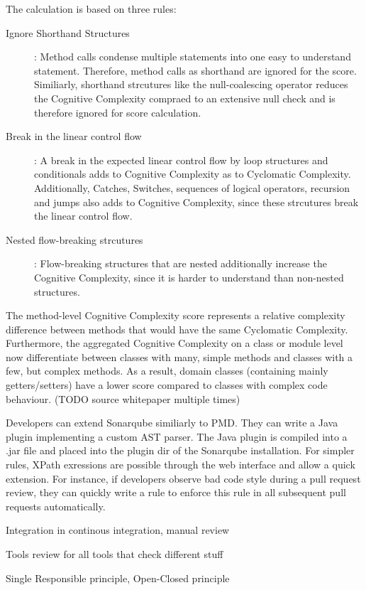 The calculation is based on three rules:
\begin{description}
    \item[Ignore Shorthand Structures]: Method calls condense multiple statements into one easy to understand statement. Therefore, method calls as shorthand are ignored for the score. Similiarly, shorthand strcutures like the null-coalescing operator reduces the Cognitive Complexity compraed to an extensive null check and is therefore ignored for score calculation.
    \item[Break in the linear control flow]: A break in the expected linear control flow by loop structures and conditionals adds to Cognitive Complexity as to Cyclomatic Complexity. Additionally, Catches, Switches, sequences of logical operators, recursion and jumps also adds to Cognitive Complexity, since these strcutures break the linear control flow.
    \item[Nested flow-breaking strcutures]: Flow-breaking structures that are nested additionally increase the Cognitive Complexity, since it is harder to understand than non-nested structures.  
\end{description}
The method-level Cognitive Complexity score represents a relative complexity difference between methods that would have the same Cyclomatic Complexity. Furthermore, the aggregated Cognitive Complexity on a class or module level now differentiate between classes with many, simple methods and classes with a few, but complex methods. As a result, domain classes (containing mainly getters/setters) have a lower score compared to classes with complex code behaviour. (TODO source whitepaper multiple times)


Developers can extend Sonarqube similiarly to PMD. They can write a Java plugin implementing a custom AST parser. The Java plugin is compiled into a .jar file and placed into the plugin dir of the Sonarqube installation. For simpler rules, XPath exressions are possible through the web interface and allow a quick extension. For instance, if developers observe bad code style during a pull request review, they can quickly write a rule to enforce this rule in all subsequent pull requests automatically.

Integration in continous integration, manual review

Tools review for all tools that check different stuff

Single Responsible principle, Open-Closed principle

